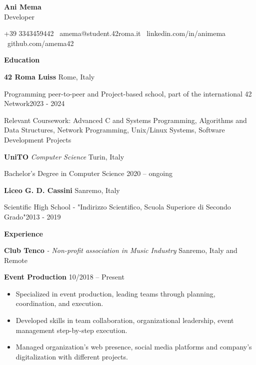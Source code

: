 \documentclass[11pt]{article}
\begin{document}
\begin{center}
    \textbf{Ani Mema}\\
    Developer
    \end{center}

\begin{center}
    +39 3343459442 \textbullet \ amema@student.42roma.it \textbullet \ linkedin.com/in/animema \textbullet \ github.com/amema42
\end{center}

\begin{center}
    \textbf{Education}
\end{center}
\textbf{42 Roma Luiss} \hfill Rome, Italy

Programming peer-to-peer and Project-based school, part of the international 42 Network\hfill 2023 - 2024

Relevant Coursework: Advanced C and Systems Programming, Algorithms and Data Structures, Network Programming, Unix/Linux Systems, Software Development Projects

\vspace{12pt}

\textbf{UniTO} \textit{Computer Science} \hfill Turin, Italy

Bachelor's Degree in Computer Science \hfill	2020 – ongoing

\vspace{12pt}

\textbf{Liceo G. D. Cassini } \hfill	Sanremo, Italy

Scientific High School - "Indirizzo Scientifico, Scuola Superiore di Secondo Grado"\hfill 2013 - 2019

\vspace{12pt}

\begin{center}
    \textbf{Experience}
\end{center}
\textbf{Club Tenco} \textit{- Non-profit association in Music Industry} \hfill Sanremo, Italy and Remote

\textbf{Event Production} \hfill 10/2018 – Present
\begin{itemize}[noitemsep, topsep=0pt, partopsep=0pt, parsep=0pt]
    \item Specialized in event production, leading teams through planning, coordination, and execution.
    \item Developed skills in team collaboration, organizational leadership, event management step-by-step execution.
    \item Managed organization's web presence, social media platforms and company's digitalization with different projects.
\end{itemize}
\end{document}
